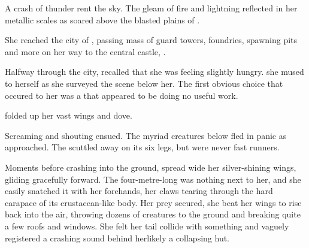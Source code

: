 
A crash of thunder rent the sky. The gleam of fire and lightning reflected in her metallic scales as \Nzessua{} soared above the blasted plains of \Machai. 

She reached the city of \Undreioth{}, passing mass of guard towers, foundries, spawning pits and more on her way to the central castle, \Orokhthegglain. 

Halfway through the city, \Nzessua{} recalled that she was feeling slightly hungry.  she mused to herself as she surveyed the scene below her. The first obvious choice that occured to her was a \nrekkloi{} \daemon{} that appeared to be doing no useful work. 

\Nzessua{} folded up her vast wings and dove. 

Screaming and shouting ensued. The myriad creatures below fled in panic as \Nzessuacrith{} approached. The \nrekkloi{} scuttled away on its six legs, but \nrekklois{} were never fast runners. 

Moments before crashing into the ground, \Nzessua{} spread wide her silver-shining wings, gliding gracefully forward. The four-metre-long \daemon{} was nothing next to her, and she easily snatched it with her forehands, her claws tearing through the hard carapace of its crustacean-like body. Her prey secured, she beat her wings to rise back into the air, throwing dozens of creatures to the ground and breaking quite a few roofs and windows. She felt her tail collide with something and vaguely registered a crashing sound behind her\dash likely a collapsing hut. 

